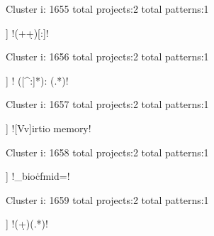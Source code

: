 Cluster i: 1655
total projects:2
total patterns:1
\begin{multicols}{1}
\begin{description}[noitemsep,topsep=0pt]
\item [[2] ] \cverb!(\w+\d+)[:\s]!
\end{description}
\end{multicols}







Cluster i: 1656
total projects:2
total patterns:1
\begin{multicols}{1}
\begin{description}[noitemsep,topsep=0pt]
\item [[2] ] \cverb!  ([^:]*):  (.*)!
\end{description}
\end{multicols}







Cluster i: 1657
total projects:2
total patterns:1
\begin{multicols}{1}
\begin{description}[noitemsep,topsep=0pt]
\item [[2] ] \cverb![Vv]irtio memory!
\end{description}
\end{multicols}







Cluster i: 1658
total projects:2
total patterns:1
\begin{multicols}{1}
\begin{description}[noitemsep,topsep=0pt]
\item [[2] ] \cverb!_bio\.cfm\?id=!
\end{description}
\end{multicols}







Cluster i: 1659
total projects:2
total patterns:1
\begin{multicols}{1}
\begin{description}[noitemsep,topsep=0pt]
\item [[2] ] \cverb!\<(\d+)\>(.*)!
\end{description}
\end{multicols}







